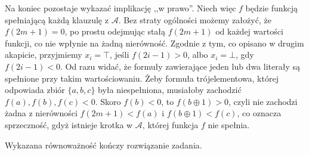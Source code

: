 \documentclass[12pt]{article}
\begin{document}
	\medskip
	
	Na koniec pozostaje wykazać implikację ,,w prawo''. Niech więc \(f\) będzie
	funkcją spełniającą każdą klauzulę z \(\mathcal{A}\). Bez straty ogólności
	możemy założyć, że \(f(2m + 1) = 0\), po prostu odejmując stałą \(f(2m +
	1)\) od każdej wartości funkcji, co nie wpłynie na żadną nierówność. Zgodnie
	z tym, co opisano w drugim akapicie, przyjmiemy \(x_{i} = \top\), jeśli
	\(f(2i - 1) > 0\), albo \(x_{i} = \bot\), gdy \(f(2i - 1) < 0\). Od razu
	widać, że formuły zawierające jeden lub dwa literały są spełnione przy takim
	wartościowaniu. Żeby formuła trójelementowa, której odpowiada zbiór \(\{a,
	b, c\}\) była niespełniona, musiałoby zachodzić \(f(a), f(b), f(c) < 0\).
	Skoro \(f(b) < 0\), to \(f(b \oplus 1) > 0\), czyli nie zachodzi żadna z
	nierówności \(f(2m + 1) < f(a)\) i \(f(b \oplus 1) < f(c)\), co oznacza
	sprzeczność, gdyż istnieje krotka w \(\mathcal{A}\), której funkcja \(f\)
	nie spełnia.
	
	\medskip
	
	Wykazana równoważność kończy rozwiązanie zadania.
\end{document}
